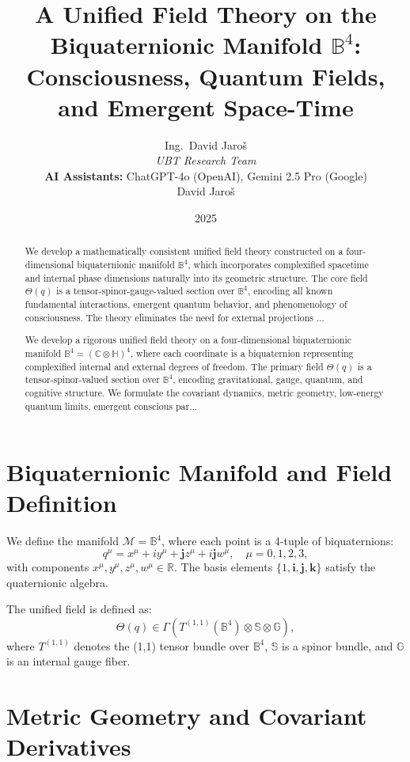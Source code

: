 \documentclass[12pt]{article}
\title{A Unified Field Theory on the Biquaternionic Manifold \( \mathbb{B}^4 \): Consciousness, Quantum Fields, and Emergent Space-Time}
\author{
Ing.~David Jaroš \\
\textit{UBT Research Team} \\
\textbf{AI Assistants:} ChatGPT-4o (OpenAI), Gemini 2.5 Pro (Google) \\
David Jaroš}
\date{2025}
\begin{document}
\maketitle

\begin{abstract}
We develop a mathematically consistent unified field theory constructed on a four-dimensional biquaternionic manifold \( \mathbb{B}^4 \), which incorporates complexified spacetime and internal phase dimensions naturally into its geometric structure. The core field \( \Theta(q) \) is a tensor-spinor-gauge-valued section over \( \mathbb{B}^4 \), encoding all known fundamental interactions, emergent quantum behavior, and phenomenology of consciousness. The theory eliminates the need for external projections ...

We develop a rigorous unified field theory on a four-dimensional biquaternionic manifold \( \mathbb{B}^4 = (\mathbb{C} \otimes \mathbb{H})^4 \), where each coordinate is a biquaternion representing complexified internal and external degrees of freedom. The primary field \( \Theta(q) \) is a tensor-spinor-valued section over \( \mathbb{B}^4 \), encoding gravitational, gauge, quantum, and cognitive structure. We formulate the covariant dynamics, metric geometry, low-energy quantum limits, emergent conscious par...
\end{abstract}

\section{Biquaternionic Manifold and Field Definition}

We define the manifold \( \mathcal{M} = \mathbb{B}^4 \), where each point is a 4-tuple of biquaternions:
\[
q^\mu = x^\mu + i y^\mu + \mathbf{j} z^\mu + i \mathbf{j} w^\mu, \quad \mu = 0,1,2,3,
\]
with components \( x^\mu, y^\mu, z^\mu, w^\mu \in \mathbb{R} \). The basis elements \( \{1, \mathbf{i}, \mathbf{j}, \mathbf{k}\} \) satisfy the quaternionic algebra.

The unified field is defined as:
\[
\Theta(q) \in \Gamma \left( T^{(1,1)}(\mathbb{B}^4) \otimes \mathbb{S} \otimes \mathbb{G} \right),
\]
where \( T^{(1,1)} \) denotes the (1,1) tensor bundle over \( \mathbb{B}^4 \), \( \mathbb{S} \) is a spinor bundle, and \( \mathbb{G} \) is an internal gauge fiber.

\section{Metric Geometry and Covariant Derivatives}
\end{document}

